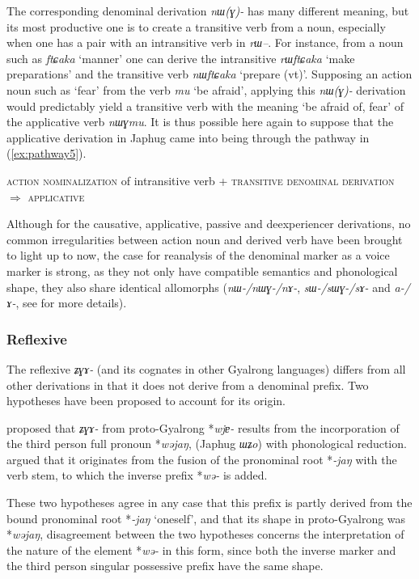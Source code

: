 \documentclass[oneside,a4paper,11pt]{article}
\newcommand{\ipa}[1]{\mbox{\phon\textit{#1}}} %
\begin{document}
The corresponding denominal derivation \ipa{nɯ(ɣ)-} has many different meaning, but its most productive one is to create a transitive verb from a noun, especially when one has a pair with an intransitive verb in \ipa{rɯ--}. For instance, from a noun such as \ipa{ftɕaka} `manner' one can derive the intransitive \ipa{rɯftɕaka} `make preparations' and the transitive verb \ipa{nɯftɕaka} `prepare (vt)'. Supposing an action noun such as `fear' from the verb \ipa{mu}  `be afraid', applying this \ipa{nɯ(ɣ)-} derivation would predictably yield a transitive verb with the meaning `be afraid of, fear' of the applicative verb \ipa{nɯɣmu}. It is thus possible here again to suppose that the applicative derivation in Japhug came into being through the pathway in (\ref{ex:pathway5}).

\begin{exe}
\ex \label{ex:pathway5}
\glt \textsc{action nominalization} of intransitive verb + \textsc{transitive denominal derivation} $\Rightarrow$ \textsc{applicative}
\end{exe}

Although for the causative, applicative, passive and deexperiencer derivations, no common irregularities between action noun and derived verb have been brought to light up to now, the case for reanalysis of the denominal marker as a voice marker is strong, as they not only have compatible semantics and phonological shape, they also share identical allomorphs (\ipa{nɯ-/nɯɣ-/nɤ-}, \ipa{sɯ-/sɯɣ-/sɤ-} and \ipa{a-/ɤ-}, see \citealt{jacques13tropative, jacques15causative, jacques07passif} for more details). 


\subsubsection{Reflexive} \label{sec:refl}
The reflexive \ipa{ʑɣɤ-} (and its cognates in other Gyalrong languages) differs from all other derivations in that it does not derive from a denominal prefix. Two hypotheses have been proposed to account for its origin. 

\citet{jacques10refl} proposed that \ipa{ʑɣɤ-} from proto-Gyalrong *\ipa{wjɐ-} results from the incorporation of the third person full pronoun *\ipa{wəjaŋ}, (Japhug \ipa{ɯʑo}) with phonological reduction. \citet{jackson14morpho} argued that it originates from the fusion of the pronominal root *\ipa{-jaŋ} with the verb stem, to which the inverse prefix *\ipa{wə-} is added.

These two hypotheses agree in any case that this prefix is partly derived from the bound pronominal root *\ipa{-jaŋ} `oneself', and that its shape in proto-Gyalrong was *\ipa{wəjaŋ}, disagreement between the two hypotheses concerns the interpretation of the nature of the element *\ipa{wə-} in this form, since both the inverse marker and the third person singular possessive prefix have the same shape.
\end{document}
